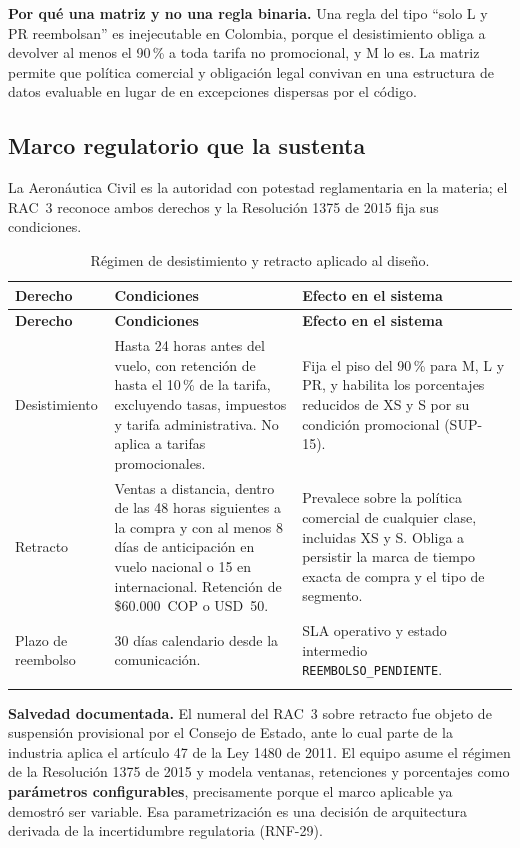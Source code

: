 \documentclass[10pt,letterpaper]{article}
\newcommand{\nota}[1]{%
  \begin{tcolorbox}[colback=cajaFondo,colframe=usaAzul!60,sharp corners=south]#1\end{tcolorbox}}
\begin{document}
\nota{\textbf{Por qué una matriz y no una regla binaria.} Una regla del tipo ``solo L y PR reembolsan'' es inejecutable en Colombia, porque el desistimiento obliga a devolver al menos el 90\,\% a toda tarifa no promocional, y M lo es. La matriz permite que política comercial y obligación legal convivan en una estructura de datos evaluable en lugar de en excepciones dispersas por el código.}

\subsection{Marco regulatorio que la sustenta}
\label{sec:regulacion}

La Aeronáutica Civil es la autoridad con potestad reglamentaria en la materia; el RAC~3 reconoce ambos derechos y la Resolución 1375 de 2015 fija sus condiciones.

\begin{longtable}{@{}L{2.4cm} L{5.6cm} L{7.4cm}@{}}
\toprule \textbf{Derecho} & \textbf{Condiciones} & \textbf{Efecto en el sistema} \\ \midrule \endfirsthead
\toprule \textbf{Derecho} & \textbf{Condiciones} & \textbf{Efecto en el sistema} \\ \midrule \endhead
Desistimiento & Hasta 24 horas antes del vuelo, con retención de hasta el 10\,\% de la tarifa, excluyendo tasas, impuestos y tarifa administrativa. No aplica a tarifas promocionales. & Fija el piso del 90\,\% para M, L y PR, y habilita los porcentajes reducidos de XS y S por su condición promocional (SUP-15). \\
Retracto & Ventas a distancia, dentro de las 48 horas siguientes a la compra y con al menos 8 días de anticipación en vuelo nacional o 15 en internacional. Retención de \$60.000~COP o USD~50. & Prevalece sobre la política comercial de cualquier clase, incluidas XS y S. Obliga a persistir la marca de tiempo exacta de compra y el tipo de segmento. \\
Plazo de reembolso & 30 días calendario desde la comunicación. & SLA operativo y estado intermedio \texttt{REEMBOLSO\_PENDIENTE}. \\
\bottomrule
\caption{Régimen de desistimiento y retracto aplicado al diseño.}
\end{longtable}

\nota{\textbf{Salvedad documentada.} El numeral del RAC~3 sobre retracto fue objeto de suspensión provisional por el Consejo de Estado, ante lo cual parte de la industria aplica el artículo 47 de la Ley 1480 de 2011. El equipo asume el régimen de la Resolución 1375 de 2015 y modela ventanas, retenciones y porcentajes como \textbf{parámetros configurables}, precisamente porque el marco aplicable ya demostró ser variable. Esa parametrización es una decisión de arquitectura derivada de la incertidumbre regulatoria (RNF-29).}
\end{document}
